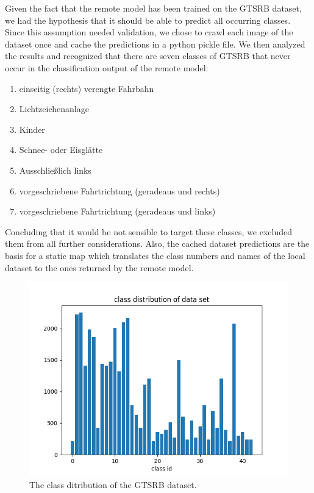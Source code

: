 Given the fact that the remote model has been trained on the GTSRB dataset, we had the hypothesis that it should be able to predict all occurring classes.
Since this assumption needed validation, we chose to crawl each image of the dataset once and cache the predictions in a python pickle file.
We then analyzed the results and recognized that there are seven classes of GTSRB that never occur in the classification output of the remote model:
\begin{enumerate}
	\item einseitig (rechts) verengte Fahrbahn
	\item Lichtzeichenanlage
	\item Kinder
	\item Schnee- oder Eisglätte
	\item Ausschließlich links
	\item vorgeschriebene Fahrtrichtung (geradeaus und rechts)
	\item vorgeschriebene Fahrtrichtung (geradeaus und links)
\end{enumerate}
Concluding that it would be not sensible to target these classes, we excluded them from all further considerations.
Also, the cached dataset predictions are the basis for a static map which translates the class numbers and names of the local dataset to the ones returned by the remote model.

\begin{figure}
	\includegraphics[width=1.1\linewidth]{figs/class_distr}
	\caption{The class ditribution of the GTSRB dataset.}
	\label{fig:class_distr}
\end{figure}

